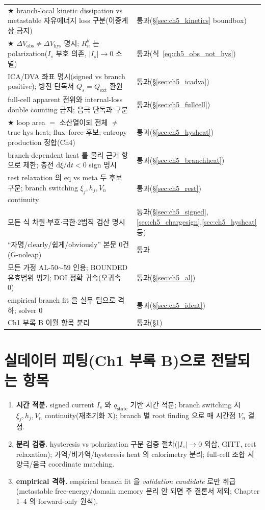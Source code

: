 \documentclass[11pt,a4paper]{article}
\newcommand{\dd}{\mathrm{d}}
\newcommand{\ext}{\mathrm{ext}}
\newcommand{\hys}{\mathrm{hys}}
\newcommand{\obs}{\mathrm{obs}}
\newcommand{\stt}{\mathrm{state}}
\begin{document}
{\begin{longtable}{>{\raggedright\arraybackslash}p{} >{\raggedright\arraybackslash}p{}}
★ branch-local kinetic dissipation vs metastable 자유에너지 loss 구분(이중계상 금지) & 통과(\S\ref{sec:ch5_kinetics} boundbox) \\
★ $\Delta V_\obs\ne\Delta V_\hys$ 명시; $R_n^b$ 는 polarization($I_s$ 부호 의존, $|I_s|{\to}0$ 소멸) & 통과(식~\eqref{eq:ch5_obs_not_hys}) \\
ICA/DVA 좌표 명시(signed vs branch positive); 방전 단독서 $Q_s{=}Q_\ext$ 환원 & 통과(\S\ref{sec:ch5_icadva}) \\
full-cell apparent 전위와 internal-loss double counting 금지; 음극 단독과 구분 & 통과(\S\ref{sec:ch5_fullcell}) \\
★ loop area $=$ 소산열이되 전체 $\ne$ true hys heat; flux--force 후보; entropy production 정합(Ch4) & 통과(\S\ref{sec:ch5_hysheat}) \\
branch-dependent heat 를 물리 근거 항으로 제한; 충전 $\dd\xi/\dd t<0$ sign 명시 & 통과(\S\ref{sec:ch5_branchheat}) \\
rest relaxation 의 eq vs meta 두 후보 구분; branch switching $\xi_j,h_j,V_n$ continuity & 통과(\S\ref{sec:ch5_rest}) \\
모든 식 차원$\cdot$부호$\cdot$극한$\cdot$2법칙 검산 명시 & 통과(\S\ref{sec:ch5_signed},\ref{sec:ch5_chargesign},\ref{sec:ch5_hysheat} 등) \\
``자명/clearly/쉽게/obviously'' 본문 0건(G-noleap) & 통과 \\
모든 가정 AL-50$\sim$59 인용; BOUNDED 유효범위 병기; DOI 정확 귀속(오귀속 0) & 통과(\S\ref{sec:ch5_al}) \\
empirical branch fit 을 실무 팁으로 격하; solver 0 & 통과(\S\ref{sec:ch5_ident}) \\
Ch1 부록 B 이월 항목 분리 & 통과(\S\ref{sec:ch5_transmit}) \\
\bottomrule
\end{longtable}
}

\section{실데이터 피팅(Ch1 부록 B)으로 전달되는 항목}\label{sec:ch5_transmit}
\begin{enumerate}[label=\arabic*),leftmargin=2.0em]
\item \textbf{시간 적분.} signed current $I_s$ 와 $q_\stt$ 기반 시간 적분; branch switching 시 $\xi_j,h_j,V_n$
  continuity(재초기화 X); branch 별 root finding 으로 매 시간점 $V_n$ 결정.
\item \textbf{분리 검증.} hysteresis vs polarization 구분 검증 절차($|I_s|\to0$ 외삽, GITT, rest relaxation);
  가역/비가역/hysteresis heat 의 calorimetry 분리; full-cell 조합 시 양극/음극 coordinate matching.
\item \textbf{empirical 격하.} empirical branch fit 을 \emph{validation candidate} 로만 취급(metastable
  free-energy/domain memory 분리 안 되면 주 결론서 제외; Chapter 1--4 의 forward-only 원칙).
\end{enumerate}
\end{document}
